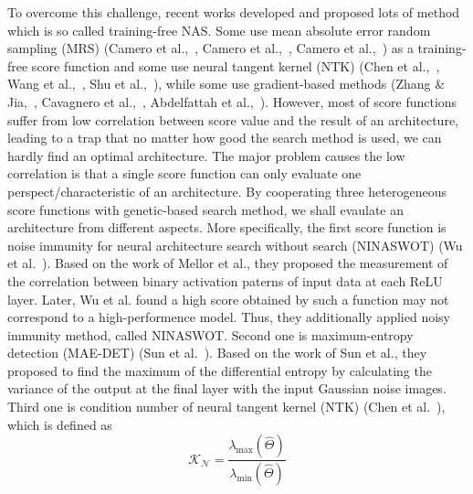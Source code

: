 \documentclass[conference]{IEEEtran}
\begin{document}
    To overcome this challenge, recent works developed and proposed lots 
    of method which is so called training-free NAS. Some use mean absolute 
    error random sampling (MRS) (Camero et al.,\ \cite{https://doi.org/10.48550/arxiv.1805.07159}, 
    Camero et al.,\ \cite{Camero_2021}, Camero et al.,\ \cite{https://doi.org/10.48550/arxiv.2106.15295}) 
    as a training-free score function and some use neural tangent kernel 
    (NTK) (Chen et al.,\ \cite{https://doi.org/10.48550/arxiv.2102.11535}, 
    Wang et al.,\ \cite{https://doi.org/10.48550/arxiv.2203.09137}, 
    Shu et al.,\ \cite{https://doi.org/10.48550/arxiv.2109.00817}), while 
    some use gradient-based methods (Zhang \& Jia,\ \cite{https://doi.org/10.48550/arxiv.2110.08616}, 
    Cavagnero et al.,\ \cite{https://doi.org/10.48550/arxiv.2207.05135}, 
    Abdelfattah et al.,\ \cite{https://doi.org/10.48550/arxiv.2101.08134}).
    However, most of score functions suffer from low correlation between 
    score value and the result of an architecture, leading to a trap that 
    no matter how good the search method is used, we can hardly find an 
    optimal architecture.
    The major problem causes the low correlation is that a single score 
    function can only evaluate one perspect/characteristic of an architecture.
    By cooperating three heterogeneous score functions with genetic-based 
    search method, we shall evaulate an architecture from different aspects. 
    More specifically, the first score function is noise immunity for neural 
    architecture search without search (NINASWOT) (Wu et al.\ \cite{10.1145/3491396.3506510}). 
    Based on the work of Mellor et al., they proposed the measurement of 
    the correlation between binary activation paterns of input data at each 
    ReLU layer. Later, Wu et al. found a high score obtained by such a 
    function may not correspond to a high-performence model. Thus, they 
    additionally applied noisy immunity method, called NINASWOT. Second one 
    is maximum-entropy detection (MAE-DET) (Sun et al.\ \cite{https://doi.org/10.48550/arxiv.2111.13336}). 
    Based on the work of Sun et al., they proposed to find the maximum of 
    the differential entropy by calculating the variance of the output at 
    the final layer with the input Gaussian noise images. Third one is 
    condition number of  neural tangent kernel (NTK) (Chen et al.\ \cite{https://doi.org/10.48550/arxiv.2102.11535}), 
    which is defined as 
    \begin{equation}
        \mathcal{K_N}=\frac{\lambda_{\textrm{max}}(\hat\Theta)}{\lambda_{\textrm{min}}(\hat\Theta)}
    \end{equation}
\end{document}
